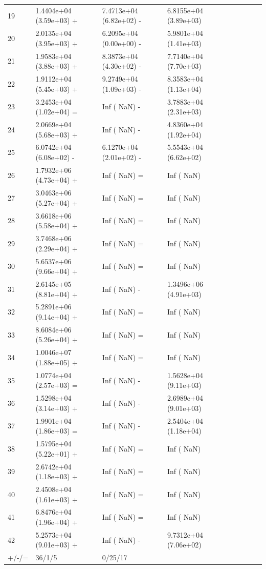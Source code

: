 \documentclass[11pt]{article}
\begin{document}
\begin{table}[htbp]
{\begin{tabular}{lllllllll}
19    & 1.4404e+04 (3.59e+03) + & 7.4713e+04 (6.82e+02) - & 6.8155e+04 (3.89e+03) \\
20    & 2.0135e+04 (3.95e+03) + & 6.2095e+04 (0.00e+00) - & 5.9801e+04 (1.41e+03) \\
21    & 1.9583e+04 (3.88e+03) + & 8.3873e+04 (4.30e+02) - & 7.7140e+04 (7.70e+03) \\
22    & 1.9112e+04 (5.45e+03) + & 9.2749e+04 (1.09e+03) - & 8.3583e+04 (1.13e+04) \\
23    & 3.2453e+04 (1.02e+04) = & Inf (     NaN) -        & 3.7883e+04 (2.31e+03) \\
24    & 2.0669e+04 (5.68e+03) + & Inf (     NaN) -        & 4.8360e+04 (1.92e+04) \\
25    & 6.0742e+04 (6.08e+02) - & 6.1270e+04 (2.01e+02) - & 5.5543e+04 (6.62e+02) \\
26    & 1.7932e+06 (4.73e+04) + & Inf (     NaN) =        & Inf (     NaN)        \\
27    & 3.0463e+06 (5.27e+04) + & Inf (     NaN) =        & Inf (     NaN)        \\
28    & 3.6618e+06 (5.58e+04) + & Inf (     NaN) =        & Inf (     NaN)        \\
29    & 3.7468e+06 (2.29e+04) + & Inf (     NaN) =        & Inf (     NaN)        \\
30    & 5.6537e+06 (9.66e+04) + & Inf (     NaN) =        & Inf (     NaN)        \\
31    & 2.6145e+05 (8.81e+04) + & Inf (     NaN) -        & 1.3496e+06 (4.91e+03) \\
32    & 5.2891e+06 (9.14e+04) + & Inf (     NaN) =        & Inf (     NaN)        \\
33    & 8.6084e+06 (5.26e+04) + & Inf (     NaN) =        & Inf (     NaN)        \\
34    & 1.0046e+07 (1.88e+05) + & Inf (     NaN) =        & Inf (     NaN)        \\
35    & 1.0774e+04 (2.57e+03) = & Inf (     NaN) -        & 1.5628e+04 (9.11e+03) \\
36    & 1.5298e+04 (3.14e+03) + & Inf (     NaN) -        & 2.6989e+04 (9.01e+03) \\
37    & 1.9901e+04 (1.86e+03) = & Inf (     NaN) -        & 2.5404e+04 (1.18e+04) \\
38    & 1.5795e+04 (5.22e+01) + & Inf (     NaN) =        & Inf (     NaN)        \\
39    & 2.6742e+04 (1.18e+03) + & Inf (     NaN) =        & Inf (     NaN)        \\
40    & 2.4508e+04 (1.61e+03) + & Inf (     NaN) =        & Inf (     NaN)        \\
41    & 6.8476e+04 (1.96e+04) + & Inf (     NaN) =        & Inf (     NaN)        \\
42    & 5.2573e+04 (9.01e+03) + & Inf (     NaN) -        & 9.7312e+04 (7.06e+02) \\
\hline
+/-/= & 36/1/5                  & 0/25/17                 & \multicolumn{1}{l}{} 
\\
\hline
\end{tabular}
}
\end{table}
\end{document}
